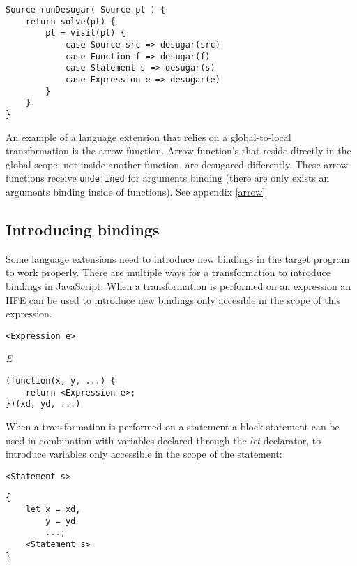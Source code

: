\begin{lstlisting}[caption=Final desugar visitor, language=rascal]
Source runDesugar( Source pt ) {
	return solve(pt) {
		pt = visit(pt) {
			case Source src => desugar(src)
			case Function f => desugar(f)
			case Statement s => desugar(s)
			case Expression e => desugar(e)
		}
	}
}
\end{lstlisting}

An example of a language extension that relies on a global-to-local transformation is the arrow function. Arrow function's that reside directly in the global scope, not inside another function, are desugared differently. These arrow functions receive \lstinline$undefined$ for arguments binding (there are only exists an arguments binding inside of functions). See appendix \ref{arrow}

\subsection{Introducing bindings}
Some language extensions need to introduce new bindings in the target program to work properly. There are multiple ways for a transformation to introduce bindings in JavaScript. When a transformation is performed on an expression an IIFE can be used to introduce new bindings only accesible in the scope of this expression.

\begin{minipage}{0.45\linewidth}
\begin{lstlisting}
<Expression e>
\end{lstlisting}
\end{minipage}
\hfill\emph{E}
\begin{minipage}{0.45\linewidth}
\begin{lstlisting}
(function(x, y, ...) {
	return <Expression e>;
})(xd, yd, ...)
\end{lstlisting}
\end{minipage}

When a transformation is performed on a statement a block statement can be used in combination with variables declared through the \textit{let} declarator, to introduce variables only accessible in the scope of the statement:

\begin{minipage}{0.45\linewidth}
\begin{lstlisting}
<Statement s>
\end{lstlisting}
\end{minipage}
\hfill
\begin{minipage}{0.45\linewidth}
\begin{lstlisting}
{
	let x = xd,
		y = yd
		...;
	<Statement s>
}
\end{lstlisting}
\end{minipage}

